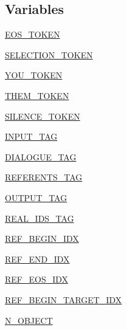 \subsection*{Variables}
\begin{DoxyCompactItemize}
\item 
\hyperlink{namespaceparlai_1_1tasks_1_1onecommon_1_1agents_ad649fbd31c42a59877ac767c8f174506}{E\+O\+S\+\_\+\+T\+O\+K\+EN}
\item 
\hyperlink{namespaceparlai_1_1tasks_1_1onecommon_1_1agents_a5c42943ac31a0ba8e87e61f332c07da6}{S\+E\+L\+E\+C\+T\+I\+O\+N\+\_\+\+T\+O\+K\+EN}
\item 
\hyperlink{namespaceparlai_1_1tasks_1_1onecommon_1_1agents_abf818c7f79d4eed5fc208b8a18b73f81}{Y\+O\+U\+\_\+\+T\+O\+K\+EN}
\item 
\hyperlink{namespaceparlai_1_1tasks_1_1onecommon_1_1agents_a74be379a3e1d24f2c11bf73a3ffb5957}{T\+H\+E\+M\+\_\+\+T\+O\+K\+EN}
\item 
\hyperlink{namespaceparlai_1_1tasks_1_1onecommon_1_1agents_ac3d4b43f0125a603ed695ae6c08c07af}{S\+I\+L\+E\+N\+C\+E\+\_\+\+T\+O\+K\+EN}
\item 
\hyperlink{namespaceparlai_1_1tasks_1_1onecommon_1_1agents_a8c21d856b75457c3d104274995f0944b}{I\+N\+P\+U\+T\+\_\+\+T\+AG}
\item 
\hyperlink{namespaceparlai_1_1tasks_1_1onecommon_1_1agents_ac0fd84abd4f5ce27812c259aad1750dc}{D\+I\+A\+L\+O\+G\+U\+E\+\_\+\+T\+AG}
\item 
\hyperlink{namespaceparlai_1_1tasks_1_1onecommon_1_1agents_ae86959ed81560617aae57bfb8c57f348}{R\+E\+F\+E\+R\+E\+N\+T\+S\+\_\+\+T\+AG}
\item 
\hyperlink{namespaceparlai_1_1tasks_1_1onecommon_1_1agents_a33dc46e56fac21e21bce39ae25b81ef7}{O\+U\+T\+P\+U\+T\+\_\+\+T\+AG}
\item 
\hyperlink{namespaceparlai_1_1tasks_1_1onecommon_1_1agents_a1295e7f6ede2646223c4c9738aa643c5}{R\+E\+A\+L\+\_\+\+I\+D\+S\+\_\+\+T\+AG}
\item 
\hyperlink{namespaceparlai_1_1tasks_1_1onecommon_1_1agents_a79f29b3ca014d12b12934d73c9c4eabd}{R\+E\+F\+\_\+\+B\+E\+G\+I\+N\+\_\+\+I\+DX}
\item 
\hyperlink{namespaceparlai_1_1tasks_1_1onecommon_1_1agents_a8da9239868b0aa386adfd57ce03584d9}{R\+E\+F\+\_\+\+E\+N\+D\+\_\+\+I\+DX}
\item 
\hyperlink{namespaceparlai_1_1tasks_1_1onecommon_1_1agents_aeae5fc579638c70679b5122c40537b5f}{R\+E\+F\+\_\+\+E\+O\+S\+\_\+\+I\+DX}
\item 
\hyperlink{namespaceparlai_1_1tasks_1_1onecommon_1_1agents_aa0863b27556dd32bbf84b155da15dbb9}{R\+E\+F\+\_\+\+B\+E\+G\+I\+N\+\_\+\+T\+A\+R\+G\+E\+T\+\_\+\+I\+DX}
\item 
\hyperlink{namespaceparlai_1_1tasks_1_1onecommon_1_1agents_a5e746b5a22648e0ed5bcadb93412cd38}{N\+\_\+\+O\+B\+J\+E\+CT}
\end{DoxyCompactItemize}


